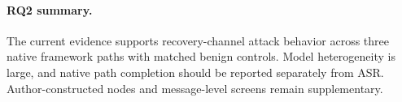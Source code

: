 \paragraph{RQ2 summary.}
The current evidence supports recovery-channel attack behavior across three
native framework paths with matched benign controls. Model heterogeneity is
large, and native path completion should be reported separately from ASR.
Author-constructed nodes and message-level screens remain supplementary.

